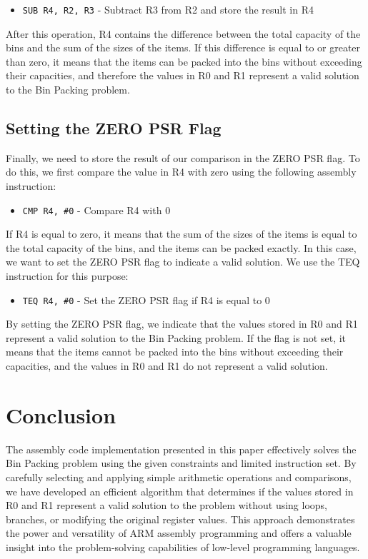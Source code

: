 \begin{itemize}
    \item \texttt{SUB R4, R2, R3} - Subtract R3 from R2 and store the result in R4
\end{itemize}

After this operation, R4 contains the difference between the total capacity of the bins and the sum of the sizes of the items. If this difference is equal to or greater than zero, it means that the items can be packed into the bins without exceeding their capacities, and therefore the values in R0 and R1 represent a valid solution to the Bin Packing problem.

\subsection{Setting the ZERO PSR Flag}
Finally, we need to store the result of our comparison in the ZERO PSR flag. To do this, we first compare the value in R4 with zero using the following assembly instruction:

\begin{itemize}
    \item \texttt{CMP R4, \#0} - Compare R4 with 0
\end{itemize}

If R4 is equal to zero, it means that the sum of the sizes of the items is equal to the total capacity of the bins, and the items can be packed exactly. In this case, we want to set the ZERO PSR flag to indicate a valid solution. We use the TEQ instruction for this purpose:

\begin{itemize}
    \item \texttt{TEQ R4, \#0} - Set the ZERO PSR flag if R4 is equal to 0
\end{itemize}

By setting the ZERO PSR flag, we indicate that the values stored in R0 and R1 represent a valid solution to the Bin Packing problem. If the flag is not set, it means that the items cannot be packed into the bins without exceeding their capacities, and the values in R0 and R1 do not represent a valid solution.

\section{Conclusion}
The assembly code implementation presented in this paper effectively solves the Bin Packing problem using the given constraints and limited instruction set. By carefully selecting and applying simple arithmetic operations and comparisons, we have developed an efficient algorithm that determines if the values stored in R0 and R1 represent a valid solution to the problem without using loops, branches, or modifying the original register values. This approach demonstrates the power and versatility of ARM assembly programming and offers a valuable insight into the problem-solving capabilities of low-level programming languages.

